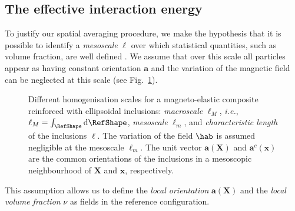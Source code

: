 \documentclass[oneside]{article}
\begin{document}
			\subsection{The effective interaction energy} 
			To justify our spatial averaging procedure, we make the hypothesis  that it is possible to identify a \emph{mesoscale} $\ell$ over which statistical quantities, such as volume fraction, are well defined \cite{Milton2004}. We assume that over this scale all particles appear as having constant orientation $\bm a$ and the variation of the magnetic field can be neglected at this scale (see Fig.~\ref{fig:homogenisation}). 
			\begin{figure}
				\begin{center}
					\begin{scriptsize}
						\def\svgwidth{1\textwidth}
						
					\end{scriptsize}
				\end{center}
				\caption{Different homogenisation scales for a magneto-elastic composite reinforced with ellipsoidal inclusions: \emph{macroscale} $\ell_M$, \textit{i.e.}, $\ell_M=\int_{\RefShape}\text{d}\RefShape$, \emph{mesoscale} $\ell_m$, and \emph{characteristic length} of the inclusions $\ell$. The variation of the field $\hab$ is assumed negligible at the mesoscale $\ell_m$. The unit vector $\bm a(\bm X)$ and $\bm a^c(\bm x)$ are the common orientations of the inclusions in a mesoscopic neighbourhood of $\bm X$ and $\bm x$, respectively.\vspace{-0.7cm}}
				\label{fig:homogenisation}
			\end{figure}
			This assumption allows us to define the \emph{local orientation} $\bm a(\bm X)$ and the \emph{local volume fraction} ${\nu}$ as fields in the reference configuration. 
			
\end{document}
